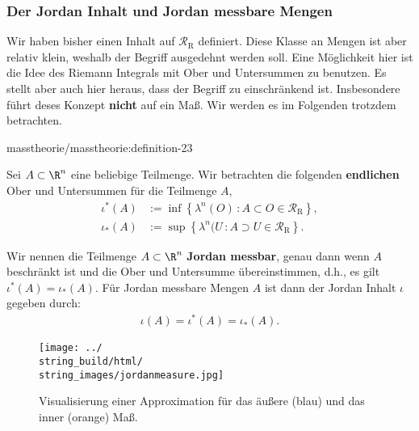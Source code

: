 \documentclass[letterpaper,10pt,german]{jupyterBook}
\begin{document}
\subsubsection{Der Jordan Inhalt und Jordan messbare Mengen}
\label{\detokenize{masstheorie/masstheorie:der-jordan-inhalt-und-jordan-messbare-mengen}}
\par
Wir haben bisher einen Inhalt auf \(\mathcal{R}_{\text{R}}\) definiert. Diese Klasse an Mengen ist aber relativ klein, weshalb der Begriff ausgedehnt werden soll. Eine Möglichkeit hier ist die Idee des Riemann Integrals mit Ober  und Untersummen zu benutzen. Es stellt aber auch hier heraus, dass der Begriff zu einschränkend ist. Insbesondere führt deses Konzept \textbf{nicht} auf ein Maß. Wir werden es im Folgenden trotzdem betrachten.
\begin{definition}{}{masstheorie/masstheorie:definition-23}



\par
Sei \(A \subset \R^n\) eine beliebige Teilmenge.
Wir betrachten die folgenden \textbf{endlichen} Ober  und Untersummen für die Teilmenge \(A\),
\begin{align*}
\iota^\ast(A) &:= \inf \left\{ \lambda^n(O) \, : A \subset O \in\mathcal{R}_{\text{R}}\right\},\\
\iota_\ast(A) &:= \sup \left\{ \lambda^n(U \, : A \supset U\in\mathcal{R}_{\text{R}} \right\}.
\end{align*}
\par
Wir nennen die Teilmenge \(A \subset \R^n\) \textbf{Jordan messbar}, genau dann wenn \(A\) beschränkt ist und die Ober  und Untersumme übereinstimmen, d.h., es gilt \(\iota^\ast(A) = \iota_\ast(A)\).
Für Jordan messbare Mengen \(A\) ist dann der Jordan Inhalt \(\iota\) gegeben durch:
\begin{align*}
\iota(A) = \iota^\ast(A) = \iota_\ast(A).
\end{align*}\end{definition}

\begin{figure}[htbp]
\centering


\noindent\texttt{[image: ../\\string\_build/html/\\string\_images/jordanmeasure.jpg]}
\caption{Visualisierung einer Approximation für das äußere (blau) und das inner (orange) Maß.}\label{\detokenize{masstheorie/masstheorie:fig-jordanmeasure}}\end{figure}
\end{document}
